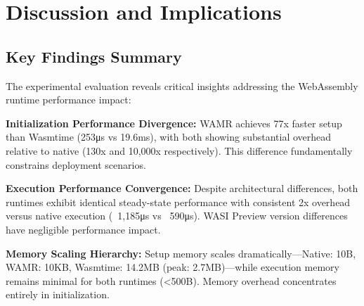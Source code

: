 


\section{Discussion and Implications}
\label{sec:eval-discussion}

\subsection{Key Findings Summary}
\label{subsec:eval-discussion-keyfindings}

The experimental evaluation reveals critical insights addressing the WebAssembly runtime performance impact:

\textbf{Initialization Performance Divergence:}
WAMR achieves 77x faster setup than Wasmtime (253μs vs 19.6ms), with both showing substantial overhead relative to native (130x and 10,000x respectively). This difference fundamentally constrains deployment scenarios.

\textbf{Execution Performance Convergence:}  
Despite architectural differences, both runtimes exhibit identical steady-state performance with consistent 2x overhead versus native execution (~1,185μs vs ~590μs). WASI Preview version differences have negligible performance impact.

\textbf{Memory Scaling Hierarchy:}
Setup memory scales dramatically—Native: 10B, WAMR: 10KB, Wasmtime: 14.2MB (peak: 2.7MB)—while execution memory remains minimal for both runtimes (<500B). Memory overhead concentrates entirely in initialization.

